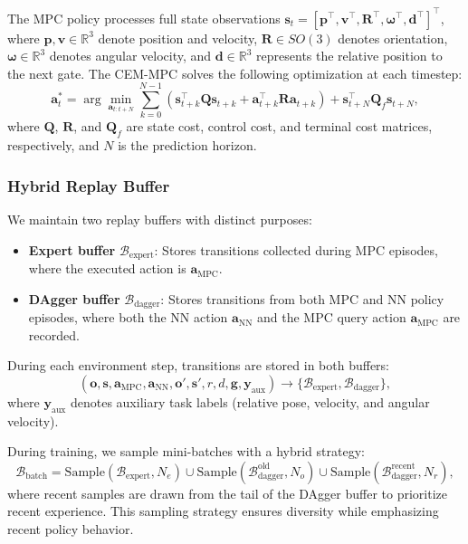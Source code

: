 The MPC policy processes full state observations $\mathbf{s}_t = [\mathbf{p}^\top, \mathbf{v}^\top, \mathbf{R}^\top, \boldsymbol{\omega}^\top, \mathbf{d}^\top]^\top$, where $\mathbf{p}, \mathbf{v} \in \mathbb{R}^3$ denote position and velocity, $\mathbf{R} \in SO(3)$ denotes orientation, $\boldsymbol{\omega} \in \mathbb{R}^3$ denotes angular velocity, and $\mathbf{d} \in \mathbb{R}^3$ represents the relative position to the next gate. The CEM-MPC solves the following optimization at each timestep:
\begin{equation}
\mathbf{a}_t^* = \arg\min_{\mathbf{a}_{t:t+N}} \sum_{k=0}^{N-1} \left( \mathbf{s}_{t+k}^\top \mathbf{Q} \mathbf{s}_{t+k} + \mathbf{a}_{t+k}^\top \mathbf{R} \mathbf{a}_{t+k} \right) + \mathbf{s}_{t+N}^\top \mathbf{Q}_f \mathbf{s}_{t+N},
\label{eq:mpc}
\end{equation}
where $\mathbf{Q}$, $\mathbf{R}$, and $\mathbf{Q}_f$ are state cost, control cost, and terminal cost matrices, respectively, and $N$ is the prediction horizon.

\subsubsection{Hybrid Replay Buffer}

We maintain two replay buffers with distinct purposes:
\begin{itemize}
    \item \textbf{Expert buffer} $\mathcal{B}_{\text{expert}}$: Stores transitions collected during MPC episodes, where the executed action is $\mathbf{a}_{\text{MPC}}$.
    \item \textbf{DAgger buffer} $\mathcal{B}_{\text{dagger}}$: Stores transitions from both MPC and NN policy episodes, where both the NN action $\mathbf{a}_{\text{NN}}$ and the MPC query action $\mathbf{a}_{\text{MPC}}$ are recorded.
\end{itemize}

During each environment step, transitions are stored in both buffers:
\begin{equation}
(\mathbf{o}, \mathbf{s}, \mathbf{a}_{\text{MPC}}, \mathbf{a}_{\text{NN}}, \mathbf{o}', \mathbf{s}', r, d, \mathbf{g}, \mathbf{y}_{\text{aux}}) \rightarrow \{\mathcal{B}_{\text{expert}}, \mathcal{B}_{\text{dagger}}\},
\end{equation}
where $\mathbf{y}_{\text{aux}}$ denotes auxiliary task labels (relative pose, velocity, and angular velocity).

During training, we sample mini-batches with a hybrid strategy:
\begin{equation}
\mathcal{B}_{\text{batch}} = \text{Sample}(\mathcal{B}_{\text{expert}}, N_e) \cup \text{Sample}(\mathcal{B}_{\text{dagger}}^{\text{old}}, N_o) \cup \text{Sample}(\mathcal{B}_{\text{dagger}}^{\text{recent}}, N_r),
\label{eq:buffer}
\end{equation}
where recent samples are drawn from the tail of the DAgger buffer to prioritize recent experience. This sampling strategy ensures diversity while emphasizing recent policy behavior.

